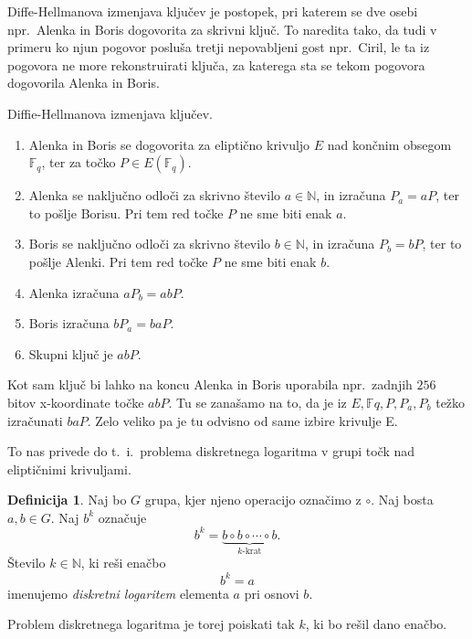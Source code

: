 \documentclass[12pt,a4paper,twoside]{article}
\theoremstyle{definition} %
\newtheorem{definicija}{Definicija}[section]
\theoremstyle{plain} %
\numberwithin{equation}{section}  %
\newcommand{\N}{\mathbb N}
\newcommand{\F}{\mathbb F}
\newcommand{\Fq}[1]{{\mathbb{F}_{#1}}}
\newcommand{\E}[1]{E({#1})}
\begin{document}
Diffe-Hellmanova izmenjava ključev je postopek, pri katerem se dve osebi npr.\  Alenka in Boris dogovorita za skrivni ključ. To naredita tako, da tudi v primeru ko njun pogovor posluša tretji nepovabljeni gost npr.\  Ciril, le ta iz pogovora ne more rekonstruirati ključa, za katerega sta se tekom pogovora dogovorila Alenka in Boris. 
\begin{algorithm}[H]
\caption[Diffe-Hellman]{Diffie-Hellmanova izmenjava ključev.}
\label{alg:diffie-hellman}

\begin{enumerate}

\item Alenka in Boris se dogovorita za eliptično krivuljo $E$ nad končnim obsegom $\Fq{q}$, ter za točko $P \in \E{\Fq{q}}$.
\item Alenka se naključno odloči za skrivno število $a \in \N$, in izračuna $P_a = aP$, ter to pošlje Borisu. Pri tem red točke $P$ ne sme biti enak $a$.
\item Boris se naključno odloči za skrivno število $b \in \N$, in izračuna $P_b = bP$, ter to pošlje Alenki. Pri tem red točke $P$ ne sme biti enak $b$.
\item Alenka izračuna $aP_b=abP$.
\item Boris izračuna $bP_a=baP$.
\item Skupni ključ je $abP$.

\end{enumerate}
\end{algorithm}

Kot sam ključ bi lahko na koncu Alenka in Boris uporabila npr.\  zadnjih $256$ bitov x-koordinate točke $abP$. Tu se zanašamo na to, da je iz $E, \F{q},P, P_a, P_b$ težko izračunati $baP$. Zelo veliko pa je tu odvisno od same izbire krivulje E.

To nas privede do t.\ i.\ problema diskretnega logaritma v grupi točk nad eliptičnimi krivuljami.

\begin{definicija}
Naj bo $G$ grupa, kjer njeno operacijo označimo z $\circ$.
Naj bosta $a, b \in G$. Naj $b^k$ označuje $$b^k = \underbrace{b\circ b\circ \cdots \circ b}_\text{$k$-krat}.$$ Število $k \in \N$, ki reši enačbo $$b^k = a$$ imenujemo \emph{diskretni logaritem} elementa $a$ pri osnovi $b$.

\end{definicija}

Problem diskretnega logaritma je torej poiskati tak $k$, ki bo rešil dano enačbo.
\end{document}
